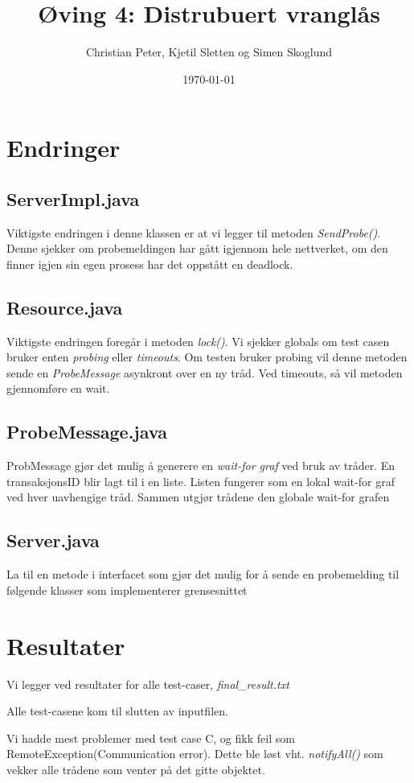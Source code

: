 \documentclass{article}
\begin{document}
\title{Øving 4: Distrubuert vranglås}
\author{Christian Peter, Kjetil Sletten og Simen Skoglund}
\date{\today}
\maketitle
\section{Endringer}
\subsection*{ServerImpl.java}
Viktigste endringen i denne klassen er at vi legger til metoden \emph{SendProbe()}. Denne sjekker om probemeldingen har gått igjennom hele nettverket, om den finner igjen sin egen prosess har det oppstått en deadlock.
\subsection*{Resource.java}
Viktigste endringen foregår i metoden \emph{lock()}. Vi sjekker globals om test casen bruker enten \emph{probing} eller \emph{timeouts}. Om testen bruker probing vil denne metoden sende en \emph{ProbeMessage} asynkront over en ny tråd. Ved timeouts, så vil metoden gjennomføre en wait.
\subsection{ProbeMessage.java}
ProbMessage gjør det mulig å generere en \emph{wait-for graf} ved bruk av tråder. En transaksjonsID blir lagt til i en liste. Listen fungerer som en lokal wait-for graf ved hver uavhengige tråd. Sammen utgjør trådene den globale wait-for grafen
\subsection{Server.java}
La til en metode i interfacet som gjør det mulig for å sende en probemelding til følgende klasser som implementerer grensesnittet

\section{Resultater}
Vi legger ved resultater for alle test-caser, \emph{final\_result.txt}

Alle test-casene kom til slutten av inputfilen.

Vi hadde mest problemer med test case C, og fikk feil som RemoteException(Communication error). Dette ble løst vht. \emph{notifyAll()} som vekker alle trådene som venter på det gitte objektet.
\end{document}
